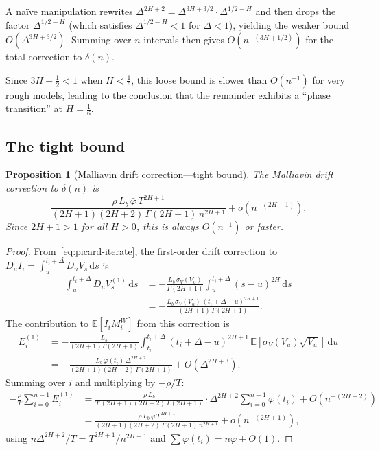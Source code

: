 \documentclass[12pt]{article}
\newtheorem{proposition}[theorem]{Proposition}
\theoremstyle{definition}
\newcommand{\E}{\mathbb{E}}
\newcommand{\dd}{\mathrm{d}}
\begin{document}
A na\"ive manipulation rewrites
$\Delta^{2H+2} = \Delta^{3H+3/2} \cdot \Delta^{1/2-H}$ and then
drops the factor $\Delta^{1/2-H}$ (which satisfies
$\Delta^{1/2-H} < 1$ for $\Delta < 1$), yielding the weaker bound
$O(\Delta^{3H+3/2})$. Summing over $n$ intervals then gives
$O(n^{-(3H+1/2)})$ for the total correction to $\delta(n)$.

Since $3H + \tfrac12 < 1$ when $H < \tfrac16$, this loose bound
is slower than $O(n^{-1})$ for very rough models, leading to the
conclusion that the remainder exhibits a ``phase transition'' at
$H = \tfrac16$.

\subsection{The tight bound}

\begin{proposition}[Malliavin drift correction---tight bound]
\label{prop:tight-remainder}
The Malliavin drift correction to $\delta(n)$ is
\begin{equation}\label{eq:drift-correction-tight}
  \frac{\rho\,L_b\,\bar\varphi\,T^{2H+1}}
  {(2H{+}1)(2H{+}2)\,\Gamma(2H{+}1)\,n^{2H+1}}
  + o(n^{-(2H+1)}).
\end{equation}
Since $2H + 1 > 1$ for all $H > 0$, this is always
$O(n^{-1})$ or faster.
\end{proposition}

\begin{proof}
From~\eqref{eq:picard-iterate}, the first-order drift correction to
$D_u I_i = \int_u^{t_i+\Delta}\!D_u V_s\,\dd s$ is
\begin{align*}
  \int_u^{t_i+\Delta}\!D_u V_s^{(1)}\,\dd s
  &= -\frac{L_b\,\sigma_V(V_u)}{\Gamma(2H{+}1)}
  \int_u^{t_i+\Delta}\!(s{-}u)^{2H}\,\dd s \\
  &= -\frac{L_b\,\sigma_V(V_u)\,
  (t_i{+}\Delta{-}u)^{2H+1}}{(2H{+}1)\,\Gamma(2H{+}1)}.
\end{align*}
The contribution to $\E[I_i M_i^W]$ from this correction is
\begin{align*}
  E_i^{(1)}
  &= -\frac{L_b}{(2H{+}1)\Gamma(2H{+}1)}
  \int_{t_i}^{t_i+\Delta}\!
  (t_i{+}\Delta{-}u)^{2H+1}\,
  \E[\sigma_V(V_u)\sqrt{V_u}]\,\dd u \\
  &= -\frac{L_b\,\varphi(t_i)\,\Delta^{2H+2}}
  {(2H{+}1)(2H{+}2)\,\Gamma(2H{+}1)}
  + O(\Delta^{2H+3}).
\end{align*}
Summing over $i$ and multiplying by $-\rho/T$:
\begin{align*}
  -\frac{\rho}{T}\sum_{i=0}^{n-1} E_i^{(1)}
  &= \frac{\rho\,L_b}
  {T\,(2H{+}1)(2H{+}2)\,\Gamma(2H{+}1)}
  \cdot \Delta^{2H+2} \sum_{i=0}^{n-1}\varphi(t_i)
  + O(n^{-(2H+2)}) \\
  &= \frac{\rho\,L_b\,\bar\varphi\,T^{2H+1}}
  {(2H{+}1)(2H{+}2)\,\Gamma(2H{+}1)\,n^{2H+1}}
  + o(n^{-(2H+1)}),
\end{align*}
using $n\Delta^{2H+2}/T = T^{2H+1}/n^{2H+1}$ and
$\sum\varphi(t_i) = n\bar\varphi + O(1)$.
\end{proof}
\end{document}
